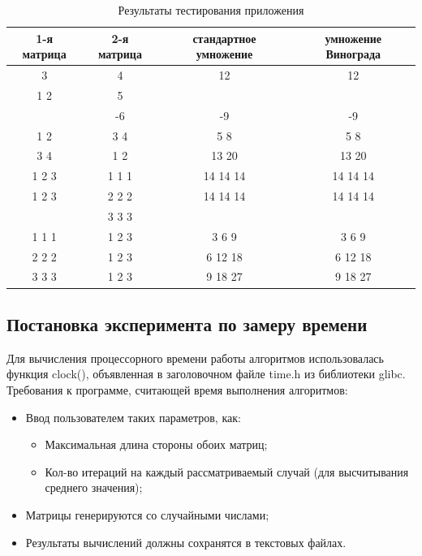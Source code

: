 \documentclass[a4paper,12pt]{article}
\begin{document}
\begin{table}[h]
\caption{\label{tablice:tests}Результаты тестирования приложения}
\begin{center}
\begin{tabular}{|c|c|c|c|}
\hline
1-я матрица & 2-я матрица & стандартное умножение & умножение Винограда \\
\hline
3 & 4 & 12 & 12 \\
\hline
1 2 & 5 & & \\
 & -6 & -9 & -9 \\
\hline
1 2 & 3 4 & 5 8 & 5 8 \\
3 4 & 1 2 & 13 20 & 13 20 \\
\hline
1 2 3 & 1 1 1 & 14 14 14 & 14 14 14 \\
1 2 3 & 2 2 2 & 14 14 14 & 14 14 14 \\
      & 3 3 3 & & \\
\hline
1 1 1 & 1 2 3 & 3 6 9 & 3 6 9 \\
2 2 2 & 1 2 3 & 6 12 18 & 6 12 18 \\
3 3 3 & 1 2 3 & 9 18 27 & 9 18 27 \\
\hline
\end{tabular}
\end{center}
\end{table}


\newpage
\subsection{Постановка эксперимента по замеру времени}
\begin{flushleft}
Для вычисления процессорного времени работы алгоритмов использовалась функция clock(), объявленная в заголовочном файле time.h из библиотеки glibc. \\
Требования к программе, считающей время выполнения алгоритмов:
\begin{itemize}
\item Ввод пользователем таких параметров, как:
\begin{itemize}
\item Максимальная длина стороны обоих матриц;
\item Кол-во итераций на каждый рассматриваемый случай (для высчитывания среднего значения);
\end{itemize}
\item Матрицы генерируются со случайными числами;
\item Результаты вычислений должны сохранятся в текстовых файлах.
\end{itemize}
\end{flushleft}
\end{document}
